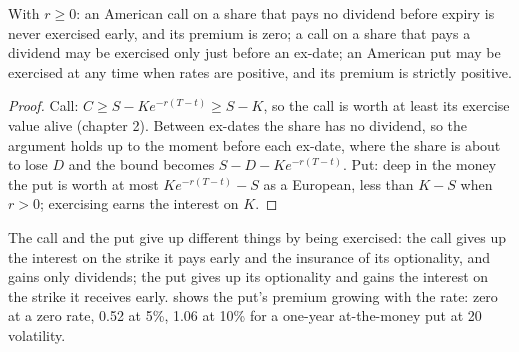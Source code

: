 \begin{proposition}\label{prop:dv:american-options-and-early-exercise:when}
With $r\ge0$: an American call on a share that pays no dividend before expiry is never
exercised early, and its premium is zero; a call on a share that pays a dividend may be
exercised only just before an ex-date; an American put may be exercised at any time
when rates are positive, and its premium is strictly positive.
\end{proposition}
\begin{proof}
Call: $C\ge S-Ke^{-r(T-t)}\ge S-K$, so the call is worth at least its exercise value
alive (chapter 2). Between ex-dates the share has no dividend, so the argument holds up
to the moment before each ex-date, where the share is about to lose $D$ and the bound
becomes $S-D-Ke^{-r(T-t)}$. Put: deep in the money the put is worth at most $Ke^{-r(T-t)}-S$
as a European, less than $K-S$ when $r>0$; exercising earns the interest on $K$.
\end{proof}

The call and the put give up different things by being exercised: the call gives up the
interest on the strike it pays early and the insurance of its optionality, and gains only
dividends; the put gives up its optionality and gains the interest on the strike it
receives early.  shows the
put's premium growing with the rate: zero at a zero rate, 0.52 at 5\%, 1.06 at 10\% for
a one-year at-the-money put at 20 volatility.

\begin{omfigure}

\label{fig:dv:american-options-and-early-exercise:premium}
\end{omfigure}

